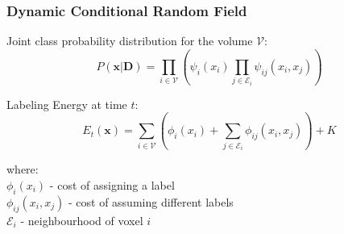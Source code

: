 \documentclass[mathserif, 10pt]{beamer}
\begin{document}
\begin{frame}
\frametitle{Dynamic Conditional Random Field}

Joint class probability distribution for the volume $\mathcal{V}$:
  \begin{equation} \label{eq:posterior}
  P(\mathbf{x}|\mathbf{D}) = \prod_{i \in \mathcal{V}} \left( \psi_i(x_i) \prod_{j \in \mathcal{E}_i} \psi_{ij}(x_i, x_j) \right) 
  \end{equation}

\vspace{-0.5cm}
Labeling Energy at time $t$:
  \begin{equation} \label{eq:energy}
  E_t(\mathbf{x}) = \sum_{i \in \mathcal{V}} \left( \phi_i(x_i) + \sum_{j \in \mathcal{E}_i} \phi_{ij} (x_i, x_j) \right) + K
  \end{equation}
  
\vspace{-0.5cm}  
where:\\
$\phi_i(x_i)$ - cost of assigning a label \\
$\phi_{ij}(x_i, x_j)$ - cost of assuming different labels\\
$\mathcal{E}_i$ - neighbourhood of voxel $i$

\end{frame}
\end{document}
